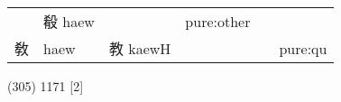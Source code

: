 \documentclass[14pt,a4paper]{scrartcl}
\begin{document}
\begin{longtable}[c]{@{}llllll@{}}
\begin{minipage}[t]{0.14\columnwidth}
\strut\end{minipage} &
\begin{minipage}[t]{0.14\columnwidth}\raggedright\strut
殽 haew
\strut\end{minipage} &
\begin{minipage}[t]{0.14\columnwidth}\raggedright\strut
\strut\end{minipage} &
\begin{minipage}[t]{0.14\columnwidth}\raggedright\strut
pure:other
\strut\end{minipage}\tabularnewline
\begin{minipage}[t]{0.14\columnwidth}\raggedright\strut
敎
\strut\end{minipage} &
\begin{minipage}[t]{0.14\columnwidth}\raggedright\strut
haew
\strut\end{minipage} &
\begin{minipage}[t]{0.14\columnwidth}\raggedright\strut
教 kaewH
\strut\end{minipage} &
\begin{minipage}[t]{0.14\columnwidth}\raggedright\strut
\strut\end{minipage} &
\begin{minipage}[t]{0.14\columnwidth}\raggedright\strut
\strut\end{minipage} &
\begin{minipage}[t]{0.14\columnwidth}\raggedright\strut
pure:qu
\strut\end{minipage}\tabularnewline
\bottomrule
\end{longtable}

(305) 1171 {[}2{]}
\end{document}
